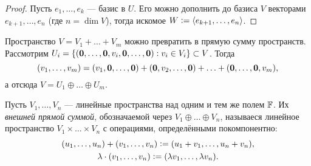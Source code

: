 \begin{proof}
    Пусть $e_1, \ldots, e_k$ --- базис в $U$. Его можно дополнить до базиса $V$ векторами $e_{k + 1}, \ldots, e_n$ (где $n = \dim V$), тогда искомое $W \vcentcolon = \langle e_{k + 1}, \ldots, e_n\rangle$.
\end{proof}

\begin{remark}
    Пространство $V = V_1 + \ldots + V_m$ можно превратить в прямую сумму пространств. Рассмотрим $U_i = \{(\boldsymbol{0}, \ldots, \boldsymbol{0}, v_i, \boldsymbol{0}, \ldots, \boldsymbol{0}) : v_i \in V_i\} \subset V$. Тогда
    \[
        (v_1, \ldots, v_m) = (v_1, \boldsymbol{0}, \ldots, \boldsymbol{0}) + (\boldsymbol{0}, v_2, \ldots, \boldsymbol{0}) + \ldots + (\boldsymbol{0}, \ldots, \boldsymbol{0}, v_m),
    \]
    а отсюда $V = U_1 \oplus \ldots \oplus U_m$.
\end{remark}

\begin{definition}
    Пусть $V_1, \ldots, V_n$ --- линейные пространства над одним и тем же полем $\mathbb{F}$. Их \textit{внешней прямой суммой}, обозначаемой через $V_1 \oplus \ldots \oplus V_n$, называеся линейное пространство $V_1 \times \ldots \times V_n$ с операциями, определёнными покомпонентно:
    \begin{gather*}
        (u_1, \ldots, u_n) + (v_1, \ldots, v_n) \vcentcolon = (u_1 + v_1, \ldots, u_n + v_n),\\
        \lambda \cdot (v_1, \ldots, v_n) \vcentcolon = (\lambda v_1, \ldots, \lambda v_n).
    \end{gather*}
\end{definition}

